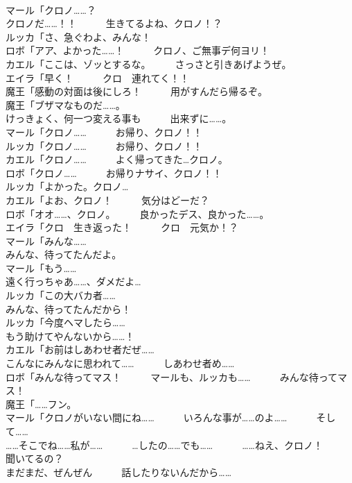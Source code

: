 \documentclass[8pt]{extreport}
\begin{document}
\begin{CJK}{UTF8}{min}
\\	マール「クロノ……？	
\\	クロノだ……！！　　　生きてるよね、クロノ！？	
\\	ルッカ「さ、急ぐわよ、みんな！	
\\	ロボ「アア、よかった……！　　　クロノ、ご無事デ何ヨリ！	
\\	カエル「ここは、ゾッとするな。　　　さっさと引きあげようぜ。	
\\	エイラ「早く！　　　クロ　連れてく！！	
\\	魔王「感動の対面は後にしろ！　　　用がすんだら帰るぞ。	
\\	魔王「ブザマなものだ……。	
\\	けっきょく、何一つ変える事も　　　出来ずに……。	
\\	マール「クロノ……　　　お帰り、クロノ！！	
\\	ルッカ「クロノ……　　　お帰り、クロノ！！	
\\	カエル「クロノ……　　　よく帰ってきた…クロノ。	
\\	ロボ「クロノ……　　　お帰りナサイ、クロノ！！	
\\	ルッカ「よかった。クロノ…	
\\	カエル「よお、クロノ！　　　気分はどーだ？	
\\	ロボ「オオ……、クロノ。　　　良かったデス、良かった……。	
\\	エイラ「クロ　生き返った！　　　クロ　元気か！？	
\\	マール「みんな……	
\\	みんな、待ってたんだよ。	
\\	マール「もう……	
\\	遠く行っちゃあ……、ダメだよ…	
\\	ルッカ「この大バカ者……	
\\	みんな、待ってたんだから！	
\\	ルッカ「今度ヘマしたら……	
\\	もう助けてやんないから……！	
\\	カエル「お前はしあわせ者だぜ……	
\\	こんなにみんなに思われて……　　　しあわせ者め……	
\\	ロボ「みんな待ってマス！　　　マールも、ルッカも……　　　みんな待ってマス！	
\\	魔王「……フン。	
\\	マール「クロノがいない間にね……　　　いろんな事が……のよ……　　　そして……	
\\	……そこでね……私が……　　　…したの……でも……　　　……ねえ、クロノ！　　　聞いてるの？	
\\	まだまだ、ぜんぜん　　　話したりないんだから……	

\end{CJK}
\end{document}
